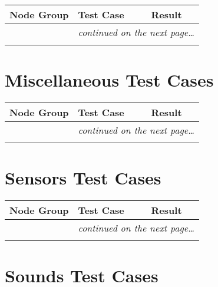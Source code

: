 \documentclass[12pt,letterpaper]{article}
\newcounter{testCaseCtr}
\newcommand{\resetTestCase}{\setcounter{testCaseCtr}{1}}
\begin{document}
\begin{center}
\setlongtables
\begin{longtable}{|l|l|l|}
\hline
\textbf{Node Group} & \textbf{Test Case} & \textbf{Result} \\
\hline\hline
\endhead
 & \multicolumn{2}{|r|}{\textsl{continued on the next page\ldots}} \\
\hline
\endfoot
\hline
\endlastfoot
& & \\
\cline{2-3}
\end{longtable}
\end{center}

\section{Miscellaneous Test Cases}
\resetTestCase

\begin{center}
\setlongtables
\begin{longtable}{|l|l|l|}
\hline
\textbf{Node Group} & \textbf{Test Case} & \textbf{Result} \\
\hline\hline
\endhead
 & \multicolumn{2}{|r|}{\textsl{continued on the next page\ldots}} \\
\hline
\endfoot
\hline
\endlastfoot
& & \\
\cline{2-3}
\end{longtable}
\end{center}

\section{Sensors Test Cases}
\resetTestCase

\begin{center}
\setlongtables
\begin{longtable}{|l|l|l|}
\hline
\textbf{Node Group} & \textbf{Test Case} & \textbf{Result} \\
\hline\hline
\endhead
 & \multicolumn{2}{|r|}{\textsl{continued on the next page\ldots}} \\
\hline
\endfoot
\hline
\endlastfoot
& & \\
\cline{2-3}
\end{longtable}
\end{center}

\section{Sounds Test Cases}
\resetTestCase
\end{document}
